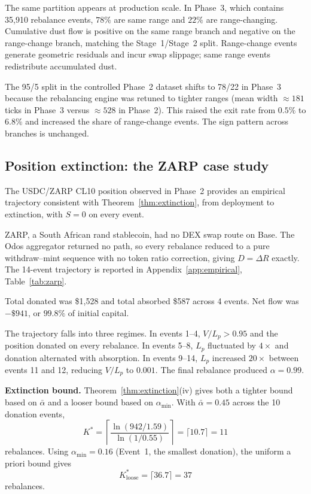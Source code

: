 \documentclass[11pt,a4paper]{article}
\theoremstyle{plain}
\begin{document}
The same partition appears at production scale. In Phase~3, which contains 35{,}910 rebalance events, $78\%$ are same range and $22\%$ are range-changing. Cumulative dust flow is positive on the same range branch and negative on the range-change branch, matching the Stage~1/Stage~2 split. Range-change events generate geometric residuals and incur swap slippage; same range events redistribute accumulated dust.

The 95/5 split in the controlled Phase~2 dataset shifts to 78/22 in Phase~3 because the rebalancing engine was retuned to tighter ranges (mean width $\approx 181$ ticks in Phase~3 versus $\approx 528$ in Phase~2). This raised the exit rate from $0.5\%$ to $6.8\%$ and increased the share of range-change events. The sign pattern across branches is unchanged.

\subsection{Position extinction: the ZARP case study}\label{sec:zarp}

The USDC/ZARP CL10 position observed in Phase~2 provides an empirical trajectory consistent with Theorem~\ref{thm:extinction}, from deployment to extinction, with $S = 0$ on every event.

ZARP, a South African rand stablecoin, had no DEX swap route on Base. The Odos aggregator returned no path, so every rebalance reduced to a pure withdraw--mint sequence with no token ratio correction, giving $D = \Delta R$ exactly. The 14-event trajectory is reported in Appendix~\ref{app:empirical}, Table~\ref{tab:zarp}.

Total donated was \$1{,}528 and total absorbed \$587 across 4 events. Net flow was $-\$941$, or $99.8\%$ of initial capital.

The trajectory falls into three regimes. In events 1--4, $V/L_p > 0.95$ and the position donated on every rebalance. In events 5--8, $L_p$ fluctuated by $4\times$ and donation alternated with absorption. In events 9--14, $L_p$ increased $20\times$ between events 11 and 12, reducing $V/L_p$ to $0.001$. The final rebalance produced $\alpha = 0.99$.

\textbf{Extinction bound.} Theorem~\ref{thm:extinction}(iv) gives both a tighter bound based on $\bar\alpha$ and a looser bound based on $\alpha_{\min}$. With $\bar\alpha = 0.45$ across the 10 donation events,
\[
K^* = \left\lceil \frac{\ln(942/1.59)}{\ln(1/0.55)} \right\rceil = \lceil 10.7 \rceil = 11
\]
rebalances. Using $\alpha_{\min} = 0.16$ (Event~1, the smallest donation), the uniform a priori bound gives
\[
K_{\text{loose}}^* = \lceil 36.7 \rceil = 37
\]
rebalances.
\end{document}
